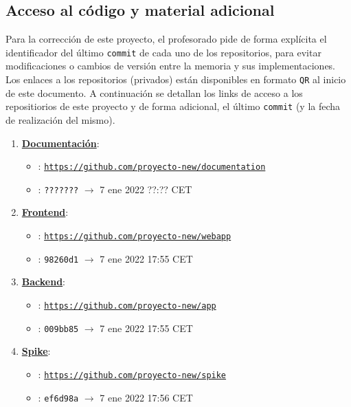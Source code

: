 \documentclass[../ei103948-project-documentation.tex]{subfiles}
\begin{document}
    \subsection{Acceso al código y material adicional}

    Para la corrección de este proyecto, el profesorado pide de forma explícita el identificador del último \texttt{commit} de cada uno de los repositorios, para evitar modificaciones o cambios de versión entre la memoria y sus implementaciones.\\

    Los enlaces a los repositorios (privados) están disponibles en formato \texttt{QR} al inicio de este documento. A continuación se detallan los links de acceso a los repositiorios de este proyecto y de forma adicional, el último \texttt{commit} (y la fecha  de realización del mismo).
        \begin{enumerate}
            \item \textbf{\underline{Documentación}}:
                \begin{itemize}
                    \item [\faIcon{code}] : \href{https://github.com/proyecto-new/documentation}{\texttt{https://github.com/proyecto-new/documentation}}
                    \item [\faIcon{calendar-check}] :  \texttt{???????} $\rightarrow$ 7 ene 2022 ??:?? CET
                \end{itemize}
            \item \textbf{\underline{Frontend}}: 
                \begin{itemize}
                \item [\faIcon{code}] : \href{https://github.com/proyecto-new/webapp}{\texttt{https://github.com/proyecto-new/webapp}}
                \item [\faIcon{calendar-check}] :  \texttt{98260d1} $\rightarrow$ 7 ene 2022 17:55 CET
                \end{itemize}
            \item \textbf{\underline{Backend}}: 
                \begin{itemize}
                    \item [\faIcon{code}] : \href{https://github.com/proyecto-new/app}{\texttt{https://github.com/proyecto-new/app}}
                    \item [\faIcon{calendar-check}] : \texttt{009bb85} $\rightarrow$ 7 ene 2022 17:55 CET
                \end{itemize}
            \item \textbf{\underline{Spike}}:
                \begin{itemize}
                    \item [\faIcon{code}] : \href{https://github.com/proyecto-new/spike}{\texttt{https://github.com/proyecto-new/spike}}
                    \item [\faIcon{calendar-check}] : \texttt{ef6d98a} $\rightarrow$ 7 ene 2022 17:56 CET
                \end{itemize}
            
        \end{enumerate}
\end{document}
